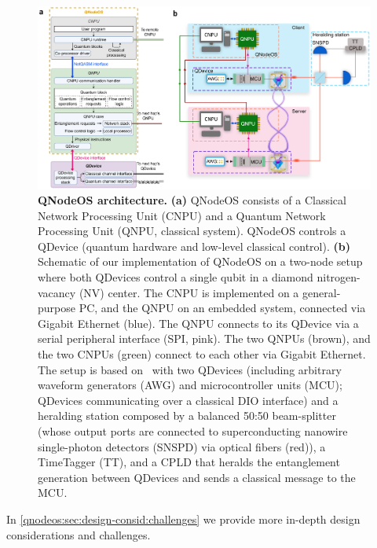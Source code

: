 \begin{figure}[t]
\centering
\includegraphics[width=1.0\textwidth]{figures/qnodeos/main/fig2/fig2.png}
\caption{\textbf{QNodeOS architecture.}
\textbf{(a)}
QNodeOS consists of a Classical Network Processing Unit (CNPU) and a Quantum Network Processing Unit (QNPU, classical system).
QNodeOS controls a QDevice (quantum hardware and low-level classical control).
\textbf{(b)}
Schematic of our implementation of QNodeOS on a two-node setup where both QDevices control a single qubit in a diamond nitrogen-vacancy (NV) center.
The CNPU is implemented on a general-purpose PC, and the QNPU on an embedded system, connected via Gigabit Ethernet (blue).
The QNPU connects to its QDevice via a serial peripheral interface (SPI, pink).
The two QNPUs (brown), and the two CNPUs (green) connect to each other via Gigabit Ethernet.
The setup is based on~\cite{pompili_2022_experimental} with two QDevices (including arbitrary waveform generators (AWG) and microcontroller units (MCU); QDevices communicating over a classical DIO interface) and a heralding station composed by a balanced 50:50 beam-splitter (whose output ports are connected to superconducting nanowire single-photon detectors (SNSPD) via optical fibers (red)), a TimeTagger (TT), and a \acf{CPLD} that heralds the entanglement generation between QDevices and sends a classical message to the MCU.}
\label{qnodeos:fig:fig2}
\end{figure}

In \cref{qnodeos:sec:design-consid:challenges} we provide more in-depth design considerations and challenges.

